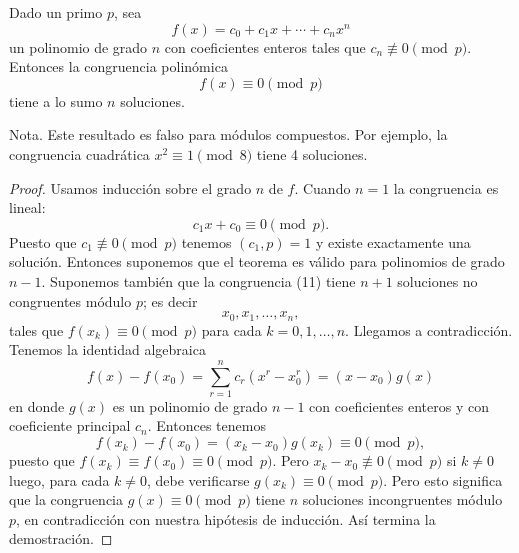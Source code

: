 \documentclass[12pt,a4paper]{book}
\begin{document}
    \begin{teorema}[Lagrange]
        Dado un primo $p$, sea
        \begin{equation*}
            f(x)=c_{0}+c_{1}x+\cdots+c_{n}x^{n}
        \end{equation*}
        un polinomio de grado $n$ con coeficientes enteros tales que
        $c_{n}\not\equiv0\pmod{p}$. Entonces la congruencia polinómica
        \begin{equation}
            f(x)\equiv0\pmod{p}
        \end{equation}
        tiene a lo sumo $n$ soluciones.
    \end{teorema}

    Nota. Este resultado es falso para módulos compuestos. Por ejemplo, la congruencia
    cuadrática $x^{2}\equiv1\pmod{8}$ tiene 4 soluciones.

    \begin{proof}
        Usamos inducción sobre el grado $n$ de $f$. Cuando $n=1$ la congruencia es
        lineal:
        \begin{equation*}
            c_{1}x+c_{0}\equiv0\pmod{p}.
        \end{equation*}
        Puesto que $c_{1}\not\equiv0\pmod{p}$ tenemos $(c_{1},p)=1$ y existe exactamente una
        solución. Entonces suponemos que el teorema es válido para polinomios de grado
        $n-1$. Suponemos también que la congruencia (11) tiene $n+1$ soluciones no
        congruentes módulo $p$; es decir
        \begin{equation*}
            x_{0},x_{1},\dots,x_{n},
        \end{equation*}
        tales que $f(x_{k})\equiv0\pmod{p}$ para cada $k=0,1,\dots,n$. Llegamos a
        contradicción. Tenemos la identidad algebraica
        \begin{equation*}
            f(x)-f(x_{0})=\sum_{r=1}^{n}c_{r}(x^{r}-x_{0}^{r})=(x-x_{0})g(x)
        \end{equation*}
        en donde $g(x)$ es un polinomio de grado $n-1$ con coeficientes enteros y con
        coeficiente principal $c_{n}$. Entonces tenemos
        \begin{equation*}
            f(x_{k})-f(x_{0})=(x_{k}-x_{0})g(x_{k})\equiv0\pmod{p},
        \end{equation*}
        puesto que $f(x_{k})\equiv f(x_{0})\equiv0\pmod{p}$. Pero $x_{k}-x_{0}\not\equiv0\pmod{p}$
        si $k\neq0$ luego, para cada $k\neq0$, debe verificarse $g(x_{k})\equiv0\pmod{p}$.
        Pero esto significa que la congruencia $g(x)\equiv0\pmod{p}$ tiene $n$ soluciones
        incongruentes módulo $p$, en contradicción con nuestra hipótesis de inducción.
        Así termina la demostración.
    \end{proof}
\end{document}
